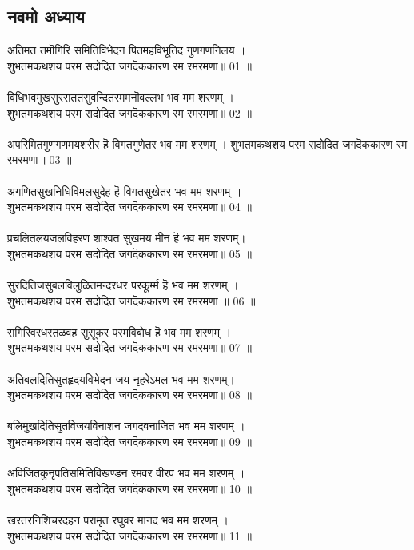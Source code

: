 \subsection{\sanskrit नवमो अध्याय}
\sanskrit
 अतिमत तमॊगिरि समितिविभेदन पितमहविभूतिद गुणगणनिलय ।\\
शुभतमकथशय परम सदोदित जगदॆककारण रम रमरमणा॥ 01 ॥\\
\\
 विधिभवमुखसुरसततसुवन्दितरममनॊवल्लभ भव मम शरणम् ।\\
शुभतमकथशय परम सदोदित जगदॆककारण रम रमरमणा॥ 02 ॥\\
\\
अपरिमितगुणगणमयशरीर हॆ विगतगुणेतर भव मम शरणम् ।
शुभतमकथशय परम सदोदित जगदॆककारण रम रमरमणा॥ 03 ॥\\
\\
अगणितसुखनिधिविमलसुदेह हॆ विगतसुखेतर भव मम शरणम् ।\\
शुभतमकथशय परम सदोदित जगदॆककारण रम रमरमणा॥ 04 ॥\\
\\
 प्रचलितलयजलविहरण शाश्वत सुखमय मीन हॆ भव मम शरणम्।\\
शुभतमकथशय परम सदोदित जगदॆककारण रम रमरमणा॥ 05 ॥\\
\\
सुरदितिजसुबलविलुळितमन्दरधर परकूर्म्म हॆ भव मम शरणम् ।\\
शुभतमकथशय परम सदोदित जगदॆककारण रम रमरमणा ॥ 06 ॥\\
\\
सगिरिवरधरतळवह सुसूकर परमविबोध हॆ भव मम शरणम् ।\\
शुभतमकथशय परम सदोदित जगदॆककारण रम रमरमणा॥ 07 ॥\\
\\
अतिबलदितिसुतहृदयविभेदन जय नृहरेऽमल भव मम शरणम्।\\
शुभतमकथशय परम सदोदित जगदॆककारण रम रमरमणा॥ 08 ॥\\
\\
बलिमुखदितिसुतविजयविनाशन जगदवनाजित भव मम शरणम् ।\\
शुभतमकथशय परम सदोदित जगदॆककारण रम रमरमणा॥ 09 ॥\\
\\
अविजितकुनृपतिसमितिविखण्डन रमवर वीरप भव मम शरणम् ।\\
शुभतमकथशय परम सदोदित जगदॆककारण रम रमरमणा॥ 10 ॥\\
\\
खरतरनिशिचरदहन परामृत रघुवर मानद भव मम शरणम् ।\\
शुभतमकथशय परम सदोदित जगदॆककारण रम रमरमणा॥ 11 ॥\\
\\
